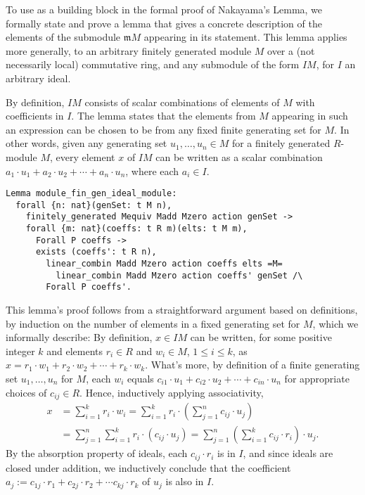 \documentclass[referee,sn-mathphys]{sn-jnl}
\theoremstyle{definition}
\theoremstyle{remark}
\numberwithin{equation}{section}
\numberwithin{figure}{subsection}
\begin{document}
To use as a building block in the formal proof of Nakayama's Lemma, we 
formally state and prove a lemma that gives a concrete description of the
elements of the submodule $\mathfrak{m} M$  appearing in its statement. 
This lemma applies more generally, to an arbitrary finitely generated module
$M$ over a (not necessarily local) commutative ring, and any submodule of the
form $I M$, for $I$ an arbitrary ideal. 

By definition, $IM$ consists of scalar
combinations of elements of $M$ with coefficients in $I$. The lemma states that
the elements from $M$ appearing in such an expression can be chosen to be from any
fixed finite generating set for $M$. In other words, given any generating set
$u_{1},\dots, u_{n} \in M$  for a  finitely generated $R$-module $M$, every
element $x$ of $I M$ can be written as a scalar combination $a_1 \cdot u_1 +
a_2  \cdot u_2 + \cdots + a_n  \cdot u_n$, where each $a_i \in I$. 

\begin{verbatim}
Lemma module_fin_gen_ideal_module:
  forall {n: nat}(genSet: t M n),
    finitely_generated Mequiv Madd Mzero action genSet ->
    forall {m: nat}(coeffs: t R m)(elts: t M m),
      Forall P coeffs ->
      exists (coeffs': t R n),
        linear_combin Madd Mzero action coeffs elts =M=
          linear_combin Madd Mzero action coeffs' genSet /\
        Forall P coeffs'.
\end{verbatim}        

This lemma's proof follows from a straightforward argument based on definitions, by
induction on the number of elements in a fixed generating set for $M$, which we
informally describe: By definition, $x \in I M$ can  be written, for some
positive integer $k$ and elements $r_i \in R$ and $w_i \in M$,
$1 \leq i \leq k$, as $x = r_1 \cdot w_1 + r_2 \cdot w_2 + \cdots +
r_k \cdot w_k$. What's more, by definition of a finite generating set $u_{1},
\dots, u_{n}$ for $M$, each $w_i$ equals $c_{i1} \cdot u_1 + c_{i2} \cdot u_2 +
\cdots + c_{in} \cdot u_n$ for appropriate choices of $c_{ij} \in R$. Hence,
inductively applying associativity, 
\begin{align*}
  x & = \sum_{i=1}^{k} r_i \cdot w_i
    = \sum_{i=1}^{k} r_i \cdot \left(\sum_{j=1}^n c_{ij} \cdot  u_j\right) \\
    & = \sum_{j=1}^{n}\sum_{i=1}^{k} r_i \cdot (c_{ij} \cdot u_j) 
    = \sum_{j=1}^{n}\left(\sum_{i=1}^{k} c_{ij} \cdot r_i\right) \cdot u_j.   
\end{align*}
By the absorption property of ideals, each  $c_{ij}  \cdot r_i$ is in $I$, and since ideals
are closed under addition, we inductively conclude that the coefficient $a_j
:= c_{1j} \cdot  r_1 +  c_{2j} \cdot  r_2 +  \cdots c_{kj}\cdot r_k$ of $u_j$
is also in $I$. 
\end{document}
